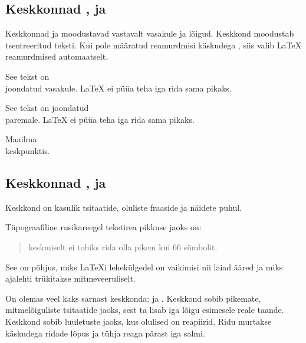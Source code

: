 \subsection{Keskkonnad ,  ja }

Keskkonnad  ja  moodustavad vastavalt
vasakule ja  lõigud. 
Keskkond  moodustab tsentreeritud teksti. Kui pole määratud
reamurdmisi käskudega \ci{\bs}, siis valib \LaTeX{} reamurdmised
automaatselt.

\begin{example}
\begin{flushleft}
See tekst on\\ joondatud vasakule.
\LaTeX{} ei püüa teha
iga rida sama pikaks.
\end{flushleft}
\end{example}

\begin{example}
\begin{flushright}
See tekst on joondatud\\paremale.
\LaTeX{} ei püüa teha
iga rida sama pikaks.
\end{flushright}
\end{example}

\begin{example}
\begin{center}
Maailma\\keskpunktis.
\end{center}
\end{example}

\subsection{Keskkonnad ,  ja }

Keskkond  on kasulik tsitaatide, oluliste fraaside ja näidete
puhul.

\begin{example}
Tüpograafiline rusikareegel
tekstirea pikkuse jaoks on:
\begin{quote}
keskmiselt ei tohiks rida
olla pikem kui 66 sümbolit.
\end{quote}
See on põhjus, miks \LaTeX i
lehekülgedel on vaikimisi nii
laiad ääred ja miks ajalehti
trükitakse mitmeveeruliselt.
\end{example}

On olemas veel kaks sarnast keskkonda:  ja .
Keskkond  sobib pikemate, mitmelõiguliste tsitaatide
jaoks, sest ta lisab iga lõigu esimesele reale taande. Keskkond
 sobib luuletuste jaoks, kus olulised on reapiirid.
Ridu murtakse käskudega \ci{\bs} ridade lõpus ja tühja reaga pärast iga
salmi.

